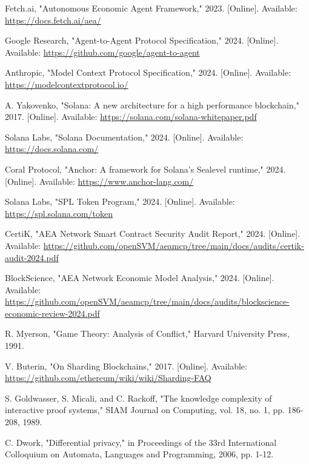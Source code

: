 \documentclass[12pt,a4paper]{article}
\begin{document}
\begin{thebibliography}{99}

Fetch.ai, "Autonomous Economic Agent Framework," 2023. [Online]. Available: \url{https://docs.fetch.ai/aea/}

Google Research, "Agent-to-Agent Protocol Specification," 2024. [Online]. Available: \url{https://github.com/google/agent-to-agent}

Anthropic, "Model Context Protocol Specification," 2024. [Online]. Available: \url{https://modelcontextprotocol.io/}

A. Yakovenko, "Solana: A new architecture for a high performance blockchain," 2017. [Online]. Available: \url{https://solana.com/solana-whitepaper.pdf}

Solana Labs, "Solana Documentation," 2024. [Online]. Available: \url{https://docs.solana.com/}

Coral Protocol, "Anchor: A framework for Solana's Sealevel runtime," 2024. [Online]. Available: \url{https://www.anchor-lang.com/}

Solana Labs, "SPL Token Program," 2024. [Online]. Available: \url{https://spl.solana.com/token}

CertiK, "AEA Network Smart Contract Security Audit Report," 2024. [Online]. Available: \url{https://github.com/openSVM/aeamcp/tree/main/docs/audits/certik-audit-2024.pdf}

BlockScience, "AEA Network Economic Model Analysis," 2024. [Online]. Available: \url{https://github.com/openSVM/aeamcp/tree/main/docs/audits/blockscience-economic-review-2024.pdf}

R. Myerson, "Game Theory: Analysis of Conflict," Harvard University Press, 1991.

V. Buterin, "On Sharding Blockchains," 2017. [Online]. Available: \url{https://github.com/ethereum/wiki/wiki/Sharding-FAQ}

S. Goldwasser, S. Micali, and C. Rackoff, "The knowledge complexity of interactive proof systems," SIAM Journal on Computing, vol. 18, no. 1, pp. 186-208, 1989.

C. Dwork, "Differential privacy," in Proceedings of the 33rd International Colloquium on Automata, Languages and Programming, 2006, pp. 1-12.


\end{thebibliography}
\end{document}
